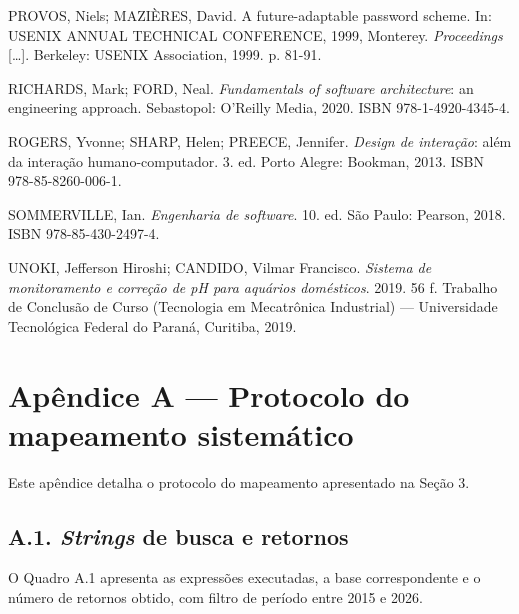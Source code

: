 \documentclass[12pt,oneside,a4paper,brazilian]{abntex2}
\begin{document}
PROVOS, Niels; MAZIÈRES, David. A future-adaptable password scheme. In: USENIX ANNUAL TECHNICAL CONFERENCE, 1999, Monterey. \textit{Proceedings} [\ldots{}]. Berkeley: USENIX Association, 1999. p. 81-91.

RICHARDS, Mark; FORD, Neal. \textit{Fundamentals of software architecture}: an engineering approach. Sebastopol: O'Reilly Media, 2020. ISBN 978-1-4920-4345-4.

ROGERS, Yvonne; SHARP, Helen; PREECE, Jennifer. \textit{Design de interação}: além da interação humano-computador. 3. ed. Porto Alegre: Bookman, 2013. ISBN 978-85-8260-006-1.

SOMMERVILLE, Ian. \textit{Engenharia de software}. 10. ed. São Paulo: Pearson, 2018. ISBN 978-85-430-2497-4.

UNOKI, Jefferson Hiroshi; CANDIDO, Vilmar Francisco. \textit{Sistema de monitoramento e correção de pH para aquários domésticos}. 2019. 56 f. Trabalho de Conclusão de Curso (Tecnologia em Mecatrônica Industrial) --- Universidade Tecnológica Federal do Paraná, Curitiba, 2019.

\endgroup

\section*{Apêndice A --- Protocolo do mapeamento sistemático}
Este apêndice detalha o protocolo do mapeamento apresentado na Seção 3.


\subsection*{A.1. \textit{Strings} de busca e retornos}
O Quadro A.1 apresenta as expressões executadas, a base correspondente e o número de retornos obtido, com filtro de período entre 2015 e 2026.
\end{document}
